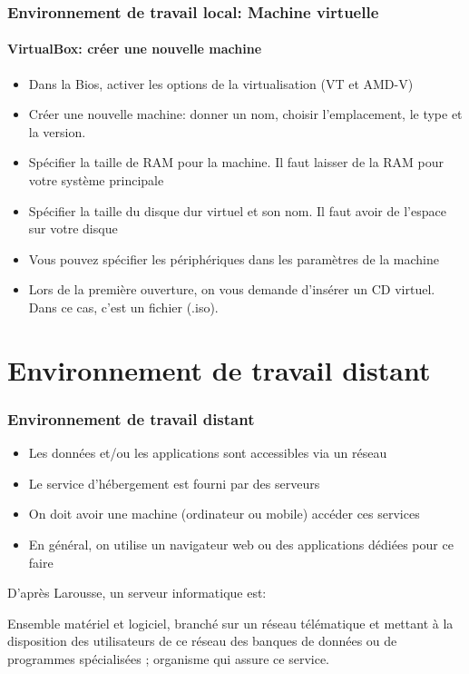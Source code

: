 \documentclass{beamer}
\begin{document}
\begin{frame}
\frametitle{Environnement de travail local: Machine virtuelle}
\framesubtitle{VirtualBox: créer une nouvelle machine}

\begin{itemize}
	\item Dans la Bios, activer les options de la virtualisation (VT et AMD-V)
	\item Créer une nouvelle machine: donner un nom, choisir l'emplacement, le type et la version. 
	\item Spécifier la taille de RAM pour la machine. Il faut laisser de la RAM pour votre système principale 
	\item Spécifier la taille du disque dur virtuel et son nom. Il faut avoir de l'espace sur votre disque
	\item Vous pouvez spécifier les périphériques dans les paramètres de la machine 
	\item Lors de la première ouverture, on vous demande d'insérer un CD virtuel. Dans ce cas, c'est un fichier (.iso). 
\end{itemize}

\end{frame}


\section{Environnement de travail distant}

\begin{frame}
\frametitle{Environnement de travail distant}

\begin{itemize}
	\item Les données et/ou les applications sont accessibles via un réseau
	\item Le service d'hébergement est fourni par des serveurs
	\item On doit avoir une machine (ordinateur ou mobile) accéder ces services
	\item En général, on utilise un navigateur web ou des applications dédiées pour ce faire
\end{itemize}

D'après Larousse, un serveur informatique est:
\begin{definition}
	Ensemble matériel et logiciel, branché sur un réseau télématique et mettant à la disposition des utilisateurs de ce réseau des banques de données ou de programmes spécialisées ; organisme qui assure ce service.
\end{definition}

\end{frame}
\end{document}
